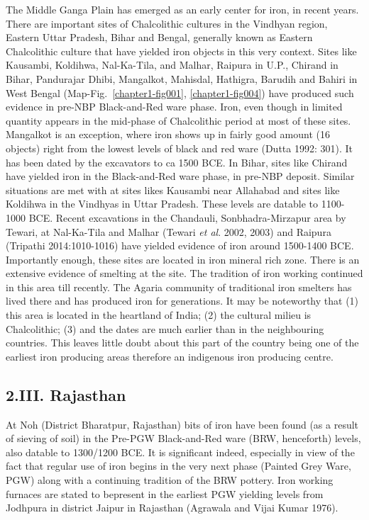The Middle Ganga Plain has emerged as an early center for iron, in recent years. There are important sites of Chalcolithic cultures in the Vindhyan region, Eastern Uttar Pradesh, Bihar and Bengal, generally known as Eastern Chalcolithic culture that have yielded iron objects in this very context. Sites like Kausambi, Koldihwa, Nal-Ka-Tila, and Malhar, Raipura in U.P., Chirand in Bihar, Pandurajar Dhibi, Mangalkot, Mahisdal, Hathigra, Barudih and Bahiri in West Bengal (Map-Fig.~\ref{chapter1-fig001}, \ref{chapter1-fig004}) have produced such evidence in pre-NBP Black-and-Red ware phase. Iron, even though in limited quantity appears in the mid-phase of Chalcolithic period at most of these sites. Mangalkot is an exception, where iron shows up in fairly good amount (16 objects) right from the lowest levels of black and red ware (Dutta 1992: 301). It has been dated by the excavators to ca 1500 BCE. In Bihar, sites like Chirand have yielded iron in the Black-and-Red ware phase, in pre-NBP deposit. Similar situations are met with at sites likes Kausambi near Allahabad and sites like Koldihwa in the Vindhyas in Uttar Pradesh. These levels are datable to 1100-1000 BCE. Recent excavations in the Chandauli, Sonbhadra-Mirzapur area by Tewari, at Nal-Ka-Tila and Malhar (Tewari \textit{et al}. 2002, 2003) and Raipura (Tripathi 2014:1010-1016) have yielded evidence of iron around 1500-1400 BCE. Importantly enough, these sites are located in iron mineral rich zone. There is an extensive evidence of smelting at the site. The tradition of iron working continued in this area till recently. The Agaria community of traditional iron smelters has lived there and has produced iron for generations. It may be noteworthy that (1) this area is located in the heartland of India; (2) the cultural milieu is Chalcolithic; (3) and the dates are much earlier than in the neighbouring countries. This leaves little doubt about this part of the country being one of the earliest iron producing areas therefore an indigenous iron producing centre.

\vspace{-.3cm}

\subsection*{2.III. Rajasthan}\label{subsection-6}

\vspace{-.2cm}

At Noh (District Bharatpur, Rajasthan) bits of iron have been found (as a result of sieving of soil) in the Pre-PGW Black-and-Red ware (BRW, henceforth) levels, also datable to 1300/1200 BCE. It is significant indeed, especially in view of the fact that regular use of iron begins in the very next phase (Painted Grey Ware, PGW) along with a continuing tradition of the BRW pottery. Iron working furnaces are stated to be\newpage present in the earliest PGW yielding levels from Jodhpura in district Jaipur in Rajasthan (Agrawala and Vijai Kumar 1976).

